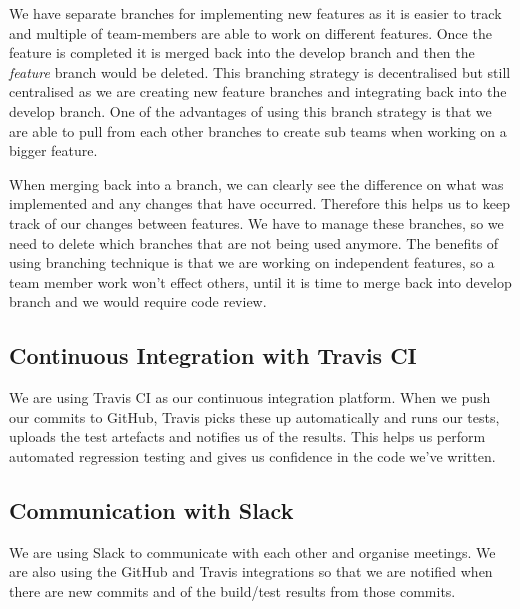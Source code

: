 \documentclass[11pt,a4paper]{report}
\begin{document}
We have separate branches for implementing new features as it is easier to track and multiple of team-members are able to work on different features. Once the feature is completed it is merged back into the develop branch and then the \emph{feature} branch would be deleted. This branching strategy is decentralised but still centralised as we are creating new feature branches and integrating back into the develop branch. One of the advantages of using this branch strategy is that we are able to pull from each other branches to create sub teams when working on a bigger feature.

When merging back into a branch, we can clearly see the difference on what was implemented and any changes that have occurred. Therefore this helps us to keep track of our changes between features.
We have to manage these branches, so we need to delete which branches that are not being used anymore.
The benefits of using branching technique is that we are working on independent features, so a team member work won't effect others, until it is time to merge back into develop branch and we would require code review.


\subsection{Continuous Integration with Travis CI}
We are using Travis CI as our continuous integration platform. When we push our commits to GitHub, Travis picks these up automatically and runs our tests, uploads the test artefacts and notifies us of the results. This helps us perform automated regression testing and gives us confidence in the code we've written.

\subsection{Communication with Slack}
We are using Slack to communicate with each other and organise meetings. We are also using the GitHub and Travis integrations so that we are notified when there are new commits and of the build/test results from those commits.
\end{document}
